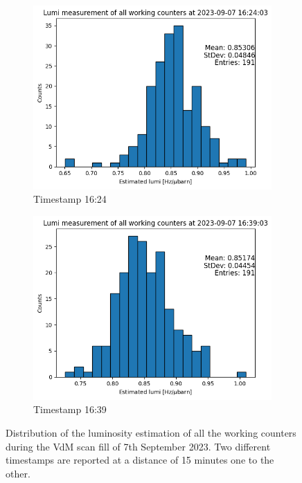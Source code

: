 \begin{figure}
    \centering
    \begin{subfigure}{0.48\textwidth}
    \includegraphics[width=\linewidth]{figures/lumi_hist_1624.png}
    \caption{Timestamp 16:24}\label{fig:lumi1624}
    \end{subfigure}
    \begin{subfigure}{0.48\textwidth}
    \includegraphics[width=\linewidth]{figures/lumi_hist_1639.png}
    \caption{Timestamp 16:39}\label{fig:lumi1639}
    \end{subfigure}
    \caption{Distribution of the luminosity estimation of all the working counters during the VdM scan fill of 7th September 2023. Two different timestamps are reported at a distance of 15 minutes one to the other. }
    \label{fig:lumi_hist_ts}
\end{figure}

